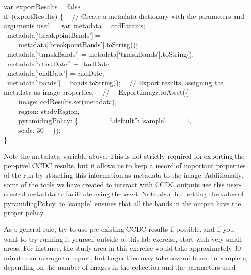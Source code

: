 \documentclass[
  letterpaper,
  DIV=11,
  numbers=noendperiod]{scrreprt}
\begin{document}
var~exportResults = false\\
if~(exportResults) \{~ ~// Create a metadata dictionary with the
parameters and arguments used.~ ~var~metadata = ccdParams;\\
\hspace*{0.333em} ~metadata{[}`breakpointBands'{]} =\\
\hspace*{0.333em} ~ ~ ~metadata{[}`breakpointBands'{]}.toString();\\
\hspace*{0.333em} ~metadata{[}`tmaskBands'{]} =
metadata{[}`tmaskBands'{]}.toString();\\
\hspace*{0.333em} ~metadata{[}`startDate'{]} = startDate;\\
\hspace*{0.333em} ~metadata{[}`endDate'{]} = endDate;\\
\hspace*{0.333em} ~metadata{[}`bands'{]} = bands.toString();~ ~// Export
results, assigning the metadata as image properties.~ ~//~
~Export.image.toAsset(\{\\
\hspace*{0.333em} ~ ~ ~image: ccdResults.set(metadata),\\
\hspace*{0.333em} ~ ~ ~region: studyRegion,\\
\hspace*{0.333em} ~ ~ ~pyramidingPolicy: \{~ ~ ~ ~ ~ ~``.default'':
`sample'~ ~ ~ ~\},\\
\hspace*{0.333em} ~ ~ ~scale: 30~ ~\});\\
\}

Note the metadata~variable above. This is not strictly required for
exporting the per-pixel CCDC results, but it allows us to keep a record
of important properties of the run by attaching this information as
metadata to the image. Additionally, some of the tools we have created
to interact with CCDC outputs use this user-created metadata to
facilitate using the asset. Note also that setting the value of
pyramidingPolicy~to `sample'~ensures that all the bands in the output
have the proper policy.

As a general rule, try to use pre-existing CCDC results if possible, and
if you want to try running it yourself outside of this lab exercise,
start with very small areas. For instance, the study area in this
exercise would take approximately 30 minutes on average to export, but
larger tiles may take several hours to complete, depending on the number
of images in the collection and the parameters used.
\end{document}
